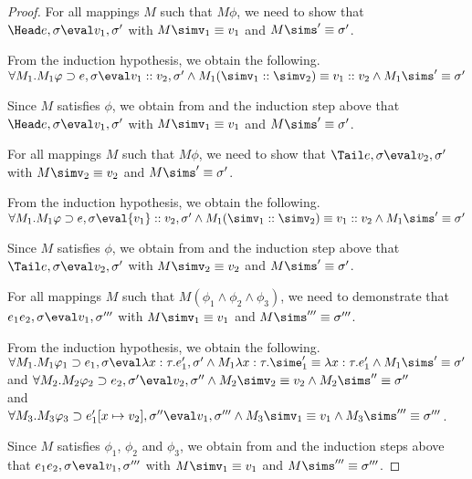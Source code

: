 \begin{proof}
  {For all mappings $M$ such that $M\phi$, we need to show that
  $\Head e,\sigma\eval v_1,\sigma'$ with
  $M \simv_1\equiv {v_1}$ and $M\sims'\equiv{\sigma'}$.

  From the induction hypothesis, we obtain the following.\\
  $\forall M_1 . M_1\phi \implies e, \sigma\eval v_1 :: v_2 , \sigma' \land M_1 (\simv_1::\simv_2)\equiv {v_1}::{v_2}\land M_1\sims'\equiv{\sigma'}$

  Since $M$ satisfies $\phi$,
  we obtain from  and the induction step above that $\Head e,\sigma{\eval}{v_1},\sigma'$ with
  $M \simv_1\equiv {v_1}$ and $M\sims'\equiv\sigma'$.}

  { For all mappings $M$ such that $M\phi$, we need to show that
    $\Tail e,\sigma\eval v_2,\sigma'$ with
    $M \simv_2\equiv{v_2}$ and $M\sims'\equiv{\sigma'}$.

    From the induction hypothesis, we obtain the following.\\
    $\forall M_1 . M_1\phi \implies e, \sigma\eval {v_1}::{v_2},{\sigma'}\land M_1(\simv_1::\simv_2)\equiv {v_1}::{v_2}\land M_1\sims'\equiv{\sigma'}$

    Since $M$ satisfies $\phi$,
    we obtain from  and the induction step above that $\Tail e,\sigma{\eval}{v_2},\sigma'$ with
    $M \simv_2\equiv {v_2}$ and $M\sims'\equiv{\sigma'}$.}

  {For all mappings $M$ such that $M(\phi_1 \land \phi_2\land \phi_3)$, we need to demonstrate that
  $e_1e_2,\sigma\eval v_1,\sigma'''$ with
   $M \simv_1 \equiv {v_1}$ and $M\sims'''\equiv{\sigma'''}$.

  From the induction hypothesis, we obtain the following.\\
  $\forall M_1 . M_1\phi_1 \implies e_1,\sigma{\eval}\lambda x : \tau.{e_1'},{\sigma'}
  \land M_1\lambda x : \tau.\sime_1' \equiv \lambda x : \tau.{e_1'} \land M_1\sims'\equiv{\sigma'}$
  and
  $\forall M_2 . M_2\phi_2 \implies e_2,\sigma'{\eval}{v_2},{\sigma''}
  \land M_2 \simv_2 \equiv {v_2} \land M_2\sims'' \equiv{\sigma''}$\\
  and
  $\forall M_3 . M_3\phi_3 \implies e_1'[x\mapsto {v_2}],\sigma''{\eval}{v_1},{\sigma'''}
  \land M_3 \simv_1\equiv {v_1} \land M_3 \sims'''\equiv{\sigma'''}$.

  Since $M$ satisfies $\phi_1$, $\phi_2$ and $\phi_3$, we obtain from  and the induction steps above that $e_1e_2,\sigma\eval v_1,\sigma'''$ with $M \simv_1 \equiv {v_1}$ and $M\sims'''\equiv{\sigma'''}$.
  }


\end{proof}
